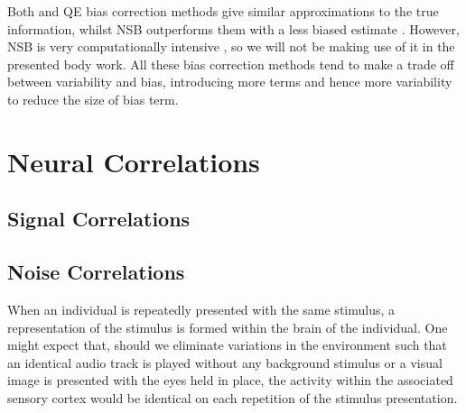 Both  and \ac{QE} bias correction methods give similar approximations to the true information, whilst \ac{NSB} outperforms them with a less biased estimate \citep{Panzeri2007}.
However, \ac{NSB} is very computationally intensive \citep{Panzeri2007}, so we will not be making use of it in the presented body work.
All these bias correction methods tend to make a trade off between variability and bias, introducing more terms and hence more variability to reduce the size of bias term.






\section{Neural Correlations}

\subsection{Signal Correlations}


\subsection{Noise Correlations}
\label{sec:bg-noisecorr}

When an individual is repeatedly presented with the same stimulus, a representation of the stimulus is formed within the brain of the individual.
One might expect that, should we eliminate variations in the environment such that an identical audio track is played without any background stimulus or a visual image is presented with the eyes held in place, the activity within the associated sensory cortex would be identical on each repetition of the stimulus presentation.

